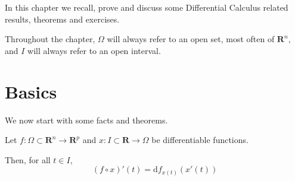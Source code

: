 In this chapter we recall, prove and discuss some Differential Calculus related results, theorems and exercises.

Throughout the chapter, $ \Omega $ will always refer to an open set, most often of $ \mathbf R^n $, and $ I $ will always refer to an open interval.

\section{Basics}

We now start with some facts and theorems.

\begin{theorem}

    Let $ f : \Omega \subset \mathbf R^n \to \mathbf R^p $ and $ x : I \subset \mathbf R \to \Omega $ be differentiable functions.

    Then, for all $ t \in I $,
    \[
        (f \circ x)'(t) = \mathrm d f_{x(t)}(x'(t))
    \]

\end{theorem}

